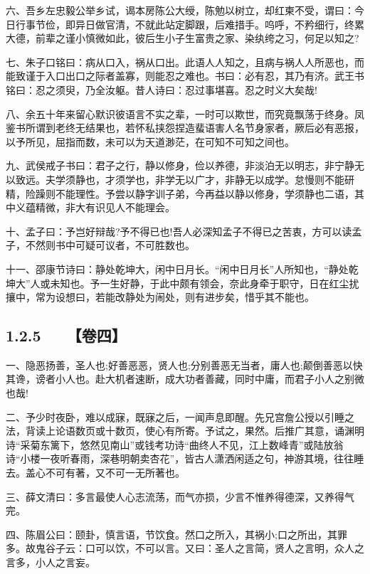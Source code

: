 \documentclass[letterpaper,10pt,english]{sphinxmanual}
\begin{document}
六、吾乡左忠毅公举乡试，谒本房陈公大绶，陈勉以树立，却红柬不受，谓曰：今日行事节俭，即异日做官清，不就此站定脚跟，后难措手。呜呼，不矜细行，终累大德，前辈之谨小慎微如此，彼后生小子生富贵之家、染纨绔之习，何足以知之?

七、朱子口铭曰：病从口入，祸从口出。此语人人知之，且病与祸人人所恶也，而能致谨于入口出口之际者盖寡，则能忍之难也。书曰：必有忍，其乃有济。武王书铭曰：忍之须臾，乃全汝躯。昔人诗曰：忍过事堪喜。忍之时义大矣哉!

八、余五十年来留心默识彼语言不实之辈，一时可以欺世，而究竟飘荡于终身。凤鉴书所谓到老终无结果也，若怀私挟怨捏造蜚语害人名节身家者，厥后必有恶报，以予所见，屈指而数，未可以为天道渺茫，在可知不可知之间也。

九、武侯戒子书曰：君子之行，静以修身，俭以养德，非淡泊无以明志，非宁静无以致远。夫学须静也，才须学也，非学无以广才，非静无以成学。怠慢则不能研精，险躁则不能理性。予尝以静字训子弟，今再益以静以修身，学须静也二语，其中义蕴精微，非大有识见人不能理会。

十、孟子曰：予岂好辩哉?予不得已也!吾人必深知孟子不得已之苦衷，方可以读孟子，不然则书中可疑可议者，不可胜数也。

十一、邵康节诗曰：静处乾坤大，闲中日月长。“闲中日月长”人所知也，“静处乾坤大”人或未知也。予一生好静，于此中颇有领会，奈此身牵于职守，日在红尘扰攘中，常为设想曰，若能改静处为闹处，则有进步矣，惜乎其不能也。


\subsection{1.2.5   【卷四】}
\label{\detokenize{p00_u5176_u5b83/_u300a_u5f20_u82f1-_u806a_u8bad_u658b_u8bed_u300b_u300a_u5f20_u5ef7_u7389-_u6f84_u6000_u56ed_u8bed_u300b_u5408_u8f91:id12}}
一、隐恶扬善，圣人也;好善恶恶，贤人也;分别善恶无当者，庸人也;颠倒善恶以快其谗，谤者小人也。赴大机者速断，成大功者善藏，同时中庸，而君子小人之别微也哉!

二、予少时夜卧，难以成寐，既寐之后，一闻声息即醒。先兄宫詹公授以引睡之法，背读上论语数页或十数页，使心有所寄。予试之，果然。后推广其意，诵渊明诗“采菊东篱下，悠然见南山”或钱考功诗“曲终人不见，江上数峰青”或陆放翁诗“小楼一夜听春雨，深巷明朝卖杏花”，皆古人潇洒闲适之句，神游其境，往往睡去。盖心不可有著，又不可一无所著也。

三、薛文清曰：多言最使人心志流荡，而气亦损，少言不惟养得德深，又养得气完。

四、陈眉公曰：颐卦，慎言语，节饮食。然口之所入，其祸小;口之所出，其罪多。故鬼谷子云：口可以饮，不可以言。又曰：圣人之言简，贤人之言明，众人之言多，小人之言妄。
\end{document}
